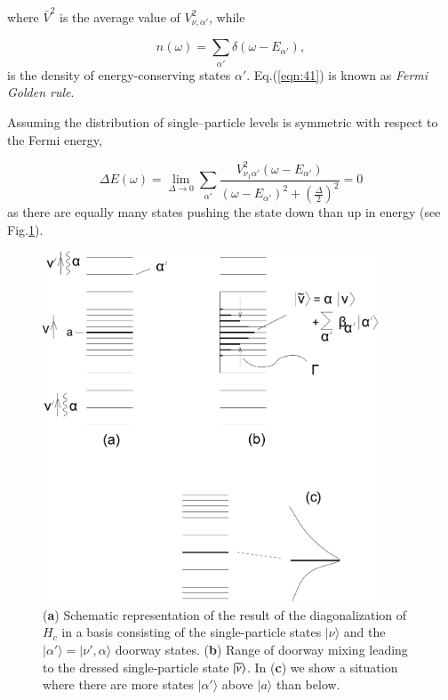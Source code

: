 \noindent where $\bar{V}^2$ is the average value of $V_{\nu ,\alpha'}^2$, while

\begin{equation}
n(\omega) = \sum_{\alpha'} \delta(\omega - E_{\alpha'}) ,
\label{eqn:42}
\end{equation}
is the density of energy-conserving states $\alpha'$. Eq.(\ref{eqn:41}) is known as {\it Fermi Golden rule}.

Assuming the distribution of single--particle levels is symmetric with respect to the Fermi energy,

\begin{equation}
\Delta E(\omega) = \lim_{\Delta \rightarrow 0} \sum_{\alpha'} \frac{V_{\nu_1 \alpha'}^2 (\omega - E_{\alpha'})}{(\omega - E_{\alpha'})^2 + \left( \frac{\Delta}{2} \right)^2} = 0
\end{equation}
as there are equally many states pushing the state down than up in energy (see Fig.\ref{fig:4.5}).

\begin{figure}
\centerline {
\includegraphics*[width=10cm]{introduccion/figs/figintroD5}
}
\caption{(\textbf{a}) Schematic representation of the result of the diagonalization of $H_{c}$ in a basis consisting of the single-particle states $|\nu \rangle$ and the $|\alpha' \rangle=|\nu', {\alpha} \rangle$ doorway states. (\textbf{b}) Range of doorway mixing leading to the dressed single-particle state $|{\widetilde\nu} \rangle$. In (\textbf{c}) we show a situation where there are more states $|\alpha' \rangle$ above $|a\rangle$ than below.}
\label{fig:4.5}
\end{figure}


